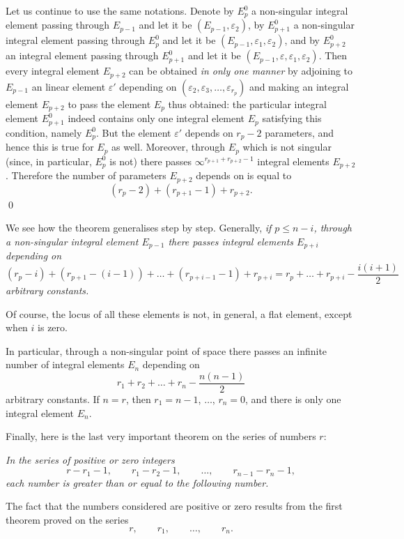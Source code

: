 \documentclass[leqno,11pt]{book}
\makeatletter
\theoremstyle{shape1}
\theoremstyle{shapesmall}
\let\old@epsilon\epsilon
\let\old@varepsilon\varepsilon
\let\epsilon\old@varepsilon
\let\varepsilon\old@epsilon
\newcommand{\somespace}{\vspace{9pt}}
\makeatother
\begin{document}
Let us continue to use the same notations. Denote by $E_{p}^{0}$ a non-singular integral element passing through $E_{p-1}$ and let it be $(E_{p-1},\epsilon_{2})$, by $E_{p+1}^{0}$ a non-singular integral element passing through $E_{p}^{0}$ and let it be $(E_{p-1},\epsilon_{1},\epsilon_{2})$, and by $E_{p+2}^{0}$ an integral element passing through $E_{p+1}^{0}$ and let it be $(E_{p-1},\epsilon,\epsilon_{1},\epsilon_{2})$. Then every integral element $E_{p+2}$ can be obtained \emph{in only one manner} by adjoining to $E_{p-1}$ an linear element $\epsilon'$ depending on $(\epsilon_{2},\epsilon_{3},\dots,\epsilon_{r_{p}})$ and making an integral element $E_{p+2}$ to pass the element $E_{p}$ thus obtained: the particular integral element $E_{p+1}^{0}$ indeed contains only one integral element $E_{p}$ satisfying this condition, namely $E_{p}^{0}$. But the element $\epsilon'$ depends on $r_{p}-2$ parameters, and hence this is true for $E_{p}$ as well. Moreover, through $E_{p}$ which is not singular (since, in particular, $E_{p}^{0}$ is not) there passes $\infty^{r_{p+1}+r_{p+2}-1}$ integral elements $E_{p+2}$. Therefore the number of parameters $E_{p+2}$ depends on is equal to
\[
(r_{p}-2)+(r_{p+1}-1)+r_{p+2}.
\]
\qed

We see how the theorem generalises step by step. Generally, \emph{if $p\le n-i$, through a non-singular integral element $E_{p-1}$ there passes integral elements $E_{p+i}$ depending on}
\[
(r_{p}-i)+(r_{p+1}-(i-1))+\dots+(r_{p+i-1}-1)+r_{p+i}=r_{p}+\dots+r_{p+i}-\frac{i(i+1)}{2}
\]
\emph{arbitrary constants.}

Of course, the locus of all these elements is not, in general, a flat element, except when $i$ is zero.

In particular, through a non-singular point of space there passes an infinite number of integral elements $E_{n}$ depending on
\[
r_{1}+r_{2}+\dots+r_{n}-\frac{n(n-1)}{2}
\]
arbitrary constants. If $n=r$, then $r_{1}=n-1$, $\dots$, $r_{n}=0$, and there is only one integral element $E_{n}$.

Finally, here is the last very important theorem on the series of numbers $r$:

\somespace

\emph{In the series of positive or zero integers}
\[
r-r_{1}-1,\qquad r_{1}-r_{2}-1,\qquad \dots,\qquad r_{n-1}-r_{n}-1,
\]
\emph{each number is greater than or equal to the following number.}

\somespace

The fact that the numbers considered are positive or zero results from the first theorem proved on the series
\[
r,\qquad r_{1},\qquad \dots,\qquad r_{n}.
\]
\end{document}
